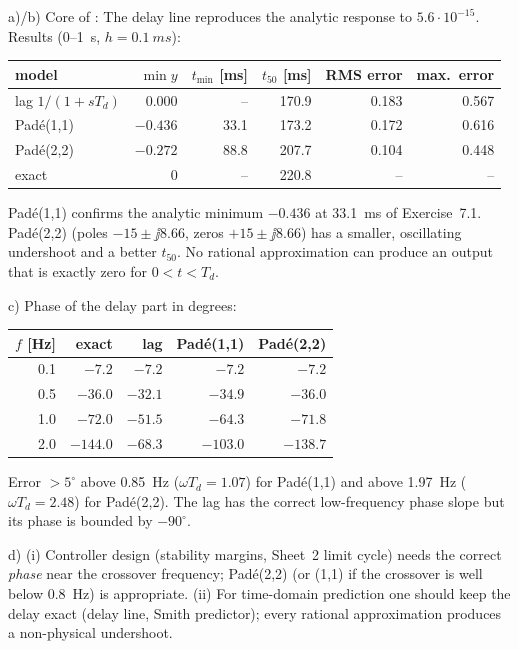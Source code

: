 \begin{solution}
a)/b) Core of :
The delay line reproduces the analytic response to $5.6\cdot10^{-15}$. Results
(\SI{0}{}--\SI{1}{s}, $h=\SI{0.1}{ms}$):
\begin{center}\small
\begin{tabular}{lrrrrr}
\toprule
model & $\min y$ & $t_{\min}$ [ms] & $t_{50}$ [ms] & RMS error & max.\ error\\
\midrule
lag $1/(1+sT_d)$ & 0.000 & -- & 170.9 & 0.183 & 0.567\\
Pad\'e(1,1) & $-0.436$ & 33.1 & 173.2 & 0.172 & 0.616\\
Pad\'e(2,2) & $-0.272$ & 88.8 & 207.7 & 0.104 & 0.448\\
exact & 0 & -- & 220.8 & -- & --\\
\bottomrule
\end{tabular}
\end{center}
Pad\'e(1,1) confirms the analytic minimum $-0.436$ at \SI{33.1}{ms} of
Exercise~7.1. Pad\'e(2,2) (poles $-15\pm\jj8.66$, zeros $+15\pm\jj8.66$) has a
smaller, oscillating undershoot and a better $t_{50}$. No rational
approximation can produce an output that is exactly zero for $0<t<T_d$.

c) Phase of the delay part in degrees:
\begin{center}\small
\begin{tabular}{rrrrr}
\toprule
$f$ [Hz] & exact & lag & Pad\'e(1,1) & Pad\'e(2,2)\\
\midrule
0.1 & $-7.2$ & $-7.2$ & $-7.2$ & $-7.2$\\
0.5 & $-36.0$ & $-32.1$ & $-34.9$ & $-36.0$\\
1.0 & $-72.0$ & $-51.5$ & $-64.3$ & $-71.8$\\
2.0 & $-144.0$ & $-68.3$ & $-103.0$ & $-138.7$\\
\bottomrule
\end{tabular}
\end{center}
Error $>5^\circ$ above \SI{0.85}{Hz} ($\omega T_d=1.07$) for Pad\'e(1,1) and above
\SI{1.97}{Hz} ($\omega T_d=2.48$) for Pad\'e(2,2). The lag has the correct
low-frequency phase slope but its phase is bounded by $-90^\circ$.

d) (i) Controller design (stability margins, Sheet~2 limit cycle) needs the
correct \emph{phase} near the crossover frequency; Pad\'e(2,2) (or (1,1) if the
crossover is well below \SI{0.8}{Hz}) is appropriate. (ii) For time-domain
prediction one should keep the delay exact (delay line, Smith predictor); every
rational approximation produces a non-physical undershoot.
\end{solution}

